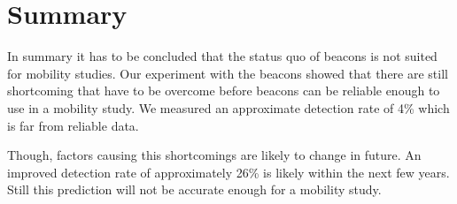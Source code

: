 \section{Summary}



\par In summary it has to be concluded that the status quo of beacons is not suited for mobility studies. Our experiment with the beacons showed that there are still shortcoming that have to be overcome before beacons can be reliable enough to use in a mobility study. 
We measured an approximate detection rate of 4\% which is far from reliable data. 
\par Though, factors causing this shortcomings are likely to change in future.  An improved detection rate of approximately 26\% is likely within the next few years. Still this prediction will not be accurate enough for a mobility study.

